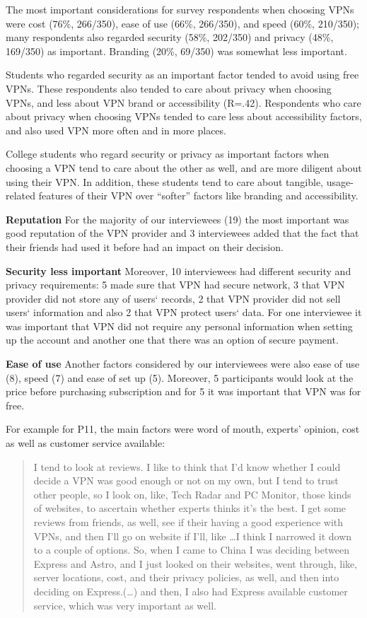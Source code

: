 The most important considerations for survey respondents when choosing VPNs
were cost (76\%, 266/350), ease of use (66\%, 266/350), and speed (60\%,
210/350); many respondents also regarded security (58\%, 202/350) and privacy
(48\%, 169/350) as important. Branding (20\%, 69/350) was somewhat less
important.

Students who regarded security as an important factor tended to avoid using
free VPNs. These respondents also tended to care about privacy when choosing
VPNs, and less about VPN brand or accessibility (R=.42). Respondents who care
about privacy when choosing VPNs tended to care less about accessibility
factors, and also used VPN more often and in more places.

College students who regard security or privacy as important factors when
choosing a VPN tend to care about the other as well, and are more diligent
about using their VPN. In addition, these students tend to care about
tangible, usage-related features of their VPN over “softer” factors like
branding and accessibility.


\textbf{Reputation} For the majority of our interviewees (19) the most
important was good reputation of the VPN provider and 3 interviewees added
that the fact that their friends had used it before had an impact on their
decision. 

\textbf{Security less important} Moreover, 10 interviewees had different
security and privacy requirements: 5 made sure that VPN had secure network, 3
that VPN provider did not store any of users‘ records, 2 that VPN provider did
not sell users‘ information and also 2 that VPN protect users‘ data. For one
interviewee it was important that VPN did not require any personal information
when setting up the account and another one that there was an option of secure
payment. 

\textbf{Ease of use} Another factors considered by our interviewees were also
ease of use (8), speed (7) and ease of set up (5). Moreover, 5 participants
would look at the price before purchasing subscription and for 5 it was
important that VPN was for free.   

For example for P11, the main factors were word of mouth, experts’ opinion,
cost as well as customer service available: \begin{quote}I tend to look at
    reviews. I like to think that I'd know whether I could decide a VPN was
    good enough or not on my own, but I tend to trust other people, so I look
    on, like, Tech Radar and PC Monitor, those kinds of websites, to ascertain
    whether experts thinks it's the best. I get some reviews from friends, as
    well, see if their having a good experience with VPNs, and then I'll go on
    website if I'll, like \dots I think I narrowed it down to a couple of
    options. So, when I came to China I was deciding between Express and
    Astro, and I just looked on their websites, went through, like, server
    locations, cost, and their privacy policies, as well, and then into
    deciding on Express.(\dots) and then, I also had Express available
customer service, which was very important as well.\end{quote}


